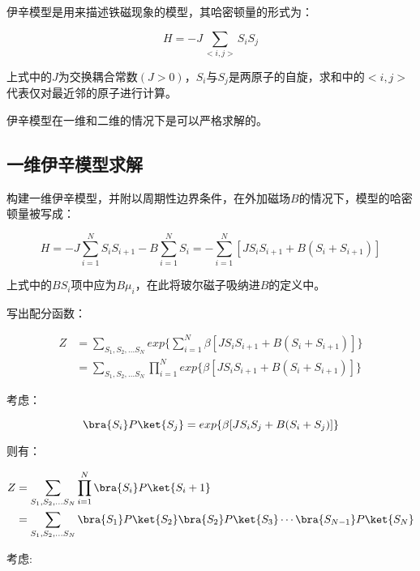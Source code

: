 
\begin{issues}
\issueDraft
\issueMissDepend
\end{issues}

伊辛模型是用来描述铁磁现象的模型，其哈密顿量的形式为：

\begin{equation}
H=-J\sum\limits_{<i,j>}S_iS_j
\end{equation}

上式中的$J$为交换耦合常数$(J>0)$，$S_i$与$S_j$是两原子的自旋，求和中的$<i,j>$代表仅对最近邻的原子进行计算。

伊辛模型在一维和二维的情况下是可以严格求解的。

\subsection{一维伊辛模型求解}

构建一维伊辛模型，并附以周期性边界条件，在外加磁场$B$的情况下，模型的哈密顿量被写成：

\begin{equation}
H=-J\sum\limits_{i=1}^NS_iS_{i+1}-B\sum\limits_{i=1}^NS_i=-\sum\limits_{i=1}^N[JS_iS_{i+1}+B(S_i+S_{i+1})]
\end{equation}

上式中的$BS_i$项中应为$B\mu_i$，在此将玻尔磁子吸纳进$B$的定义中。

写出配分函数：

\begin{align}
Z&=\sum\limits_{S_1,S_2,...S_N}exp\{\sum\limits_{i=1}^N\beta[JS_iS_{i+1}+B(S_i+S_{i+1})]\} \\
&=\sum\limits_{S_1,S_2,...S_N}\prod\limits_{i=1}^N exp\{\beta[JS_iS_{i+1}+B(S_i+S_{i+1})]\}
\end{align}

考虑：

\begin{equation}
\bra{S_i}P\ket{S_j}=exp\{\beta[JS_iS_{j}+B(S_i+S_{j})]\}
\end{equation}

则有：

\begin{align}
Z&=\sum\limits_{S_1,S_2,...S_N}\prod\limits_{i=1}^N\bra{S_i}P\ket{S_i+1} \\
&=\sum\limits_{S_1,S_2,...S_N}\bra{S_1}P\ket{S_2} \bra{S_2}P\ket{S_3}\cdots\bra{S_{N-1}}P\ket{S_N} 
\end{align}

考虑:

